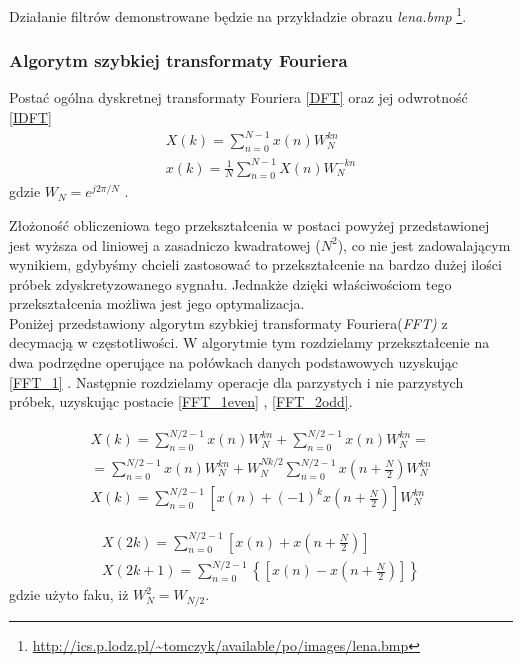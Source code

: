 \documentclass{classrep}
\begin{document}
Działanie filtrów demonstrowane będzie na przykładzie obrazu \emph{lena.bmp} \footnote{\url{http://ics.p.lodz.pl/~tomczyk/available/po/images/lena.bmp}}.

\subsubsection{Algorytm szybkiej transformaty Fouriera}

Postać ogólna dyskretnej transformaty Fouriera \ref{DFT} oraz jej odwrotność \ref{IDFT}
\begin{eqnarray}
\label{DFT}  X(k) = \sum \limits ^{N-1} _{n=0} x(n) W ^{kn} _{N}\\
\label{IDFT}  x(k) = \frac{1}{N} \sum \limits ^{N-1} _{n=0} X(n) W ^{-kn} _{N}
\end{eqnarray}
gdzie $W _N  = e^{j2 \pi / N}$ .

\indent Złożoność obliczeniowa tego przekształcenia w postaci powyżej przedstawionej jest wyższa od liniowej a zasadniczo kwadratowej ($N^2$), co nie jest zadowalającym wynikiem, gdybyśmy chcieli zastosować to przekształcenie na bardzo dużej ilości próbek zdyskretyzowanego sygnału. Jednakże dzięki właściwościom tego przekształcenia możliwa jest jego optymalizacja. \\
Poniżej przedstawiony algorytm szybkiej transformaty Fouriera(\emph{FFT)} z decymacją w częstotliwości. W algorytmie tym rozdzielamy przekształcenie na dwa podrzędne operujące na połówkach danych podstawowych uzyskując \ref{FFT_1} . Następnie rozdzielamy operacje dla parzystych i nie parzystych próbek, uzyskując postacie \ref{FFT_1even} , \ref{FFT_2odd}. 

\begin{multline}
X(k) = \sum \limits ^{N/2-1} _{n=0} x(n) W ^{kn} _{N} + \sum \limits ^{N/2-1} _{n=0} x(n) W ^{kn} _{N} = \\
= \sum \limits ^{N/2-1} _{n=0} x(n) W ^{kn} _{N} + W ^{N k/2} _{N} \sum \limits ^{N/2-1} _{n=0} x \left( n + \frac{N}{2} \right) W ^{kn} _{N} \\
\label{FFT_1} X(k) = \sum \limits ^{N/2-1} _{n=0} \left[ x(n) + (-1) ^{k} x(n+\frac{N}{2} ) \right]W ^{kn} _{N}
\end{multline}

\begin{eqnarray}
\label{FFT_1even} X(2k) = \sum \limits ^{N/2-1} _{n=0} \left[ x(n) + x \left(  n+\frac{N}{2} \right)  \right]\\
\label{FFT_2odd} X(2k+1) = \sum \limits ^{N/2-1} _{n=0} \left\{ \left[ x(n) - x \left(  n+\frac{N}{2} \right) \right] \right\}
\end{eqnarray}
gdzie użyto faku, iż $W _N ^2  = W _{N/2}$.
\end{document}
